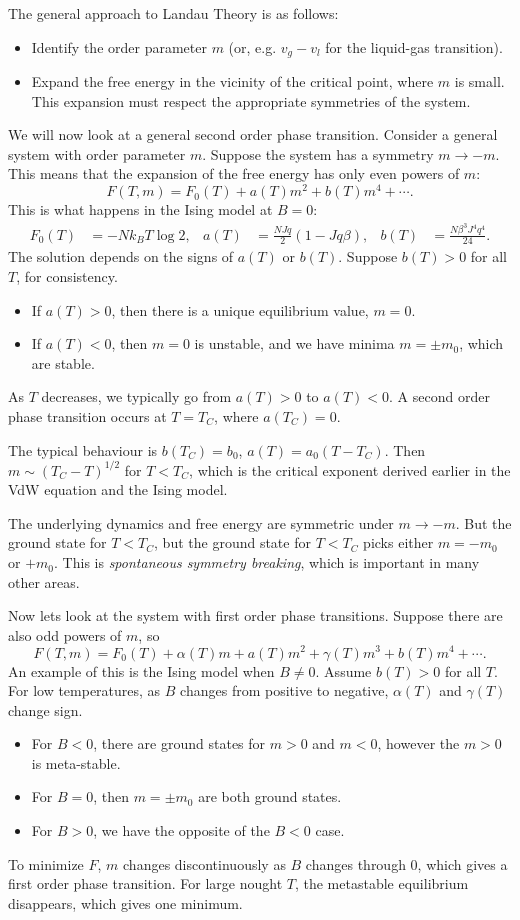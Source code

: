 \documentclass[12pt]{article}
\begin{document}
The general approach to Landau Theory is as follows:
\begin{itemize}
	\item Identify the order parameter $m$ (or, e.g. $v_g - v_l$ for the liquid-gas transition).
	\item Expand the free energy in the vicinity of the critical point, where $m$ is small. This expansion must respect the appropriate symmetries of the system.
\end{itemize}

We will now look at a general second order phase transition. Consider a general system with order parameter $m$. Suppose the system has a symmetry $m \to -m$. This means that the expansion of the free energy has only even powers of $m$:
\[
F(T, m) = F_0(T) + a(T) m^2 + b(T) m^4 + \cdots.
\]
This is what happens in the Ising model at $B = 0$:
\begin{align*}
	F_0(T) &= - N k_B T \log 2, & a(T) &= \frac{N Jq}{2}(1 - Jq\beta), & b(T) &= \frac{N\beta^3 J^4 q^4}{24}.
\end{align*}
The solution depends on the signs of $a(T)$ or $b(T)$. Suppose $b(T) > 0$ for all $T$, for consistency.
\begin{itemize}
	\item If $a(T) > 0$, then there is a unique equilibrium value, $m = 0$.
	\item If $a(T) < 0$, then $m = 0$ is unstable, and we have minima $m = \pm m_0$, which are stable.
\end{itemize}

As $T$ decreases, we typically go from $a(T) > 0$ to $a(T) < 0$. A second order phase transition occurs at $T = T_C$, where $a(T_C) = 0$. 

The typical behaviour is $b(T_C) = b_0$, $a(T) = a_0(T - T_C)$. Then $m \sim (T_C - T)^{1/2}$ for $T < T_C$, which is the critical exponent derived earlier in the VdW equation and the Ising model.

The underlying dynamics and free energy are symmetric under $m \to -m$. But the ground state for $T < T_C$, but the ground state for $T < T_C$ picks either $m = - m_0$ or $+m_0$. This is \emph{spontaneous symmetry breaking}, which is important in many other areas.

Now lets look at the system with first order phase transitions. Suppose there are also odd powers of $m$, so
\[
F(T, m) = F_0(T) + \alpha(T) m + a(T) m^2 + \gamma(T) m^3 + b(T) m^{4} + \cdots.
\]
An example of this is the Ising model when $B \neq 0$. Assume $b(T) > 0$ for all $T$. For low temperatures, as $B$ changes from positive to negative, $\alpha(T)$ and $\gamma(T)$ change sign.
\begin{itemize}
	\item For $B < 0$, there are ground states for $m > 0$ and $m < 0$, however the $m > 0$ is meta-stable.
	\item For $B = 0$, then $m = \pm m_0$ are both ground states.
	\item For $B > 0$, we have the opposite of the $B < 0$ case.
\end{itemize}

To minimize $F$, $m$ changes discontinuously as $B$ changes through $0$, which gives a first order phase transition. For large nought $T$, the metastable equilibrium disappears, which gives one minimum.

\newpage

\printindex
\end{document}
